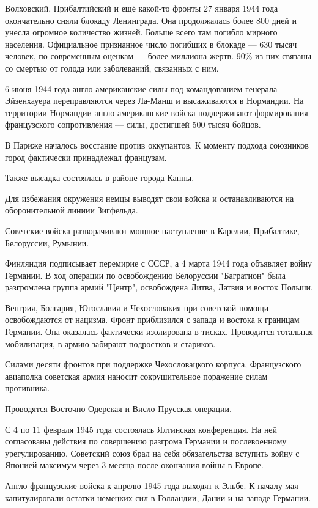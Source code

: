 \documentclass{article}
\begin{document}
Волховский, Прибалтийский и ещё какой-то фронты 27 января 1944 года окончательно сняли блокаду Ленинграда. Она продолжалась более 800 дней и унесла огромное количество жизней. Больше всего там погибло мирного населения. Официальное признанное число погибших в блокаде --- 630 тысяч человек, по современным оценкам --- более миллиона жертв. 90\% из них связаны со смертью от голода или заболеваний, связанных с ним.

6 июня 1944 года англо-американские силы под командованием генерала Эйзенхауера переправляются через Ла-Манш и высаживаются в Нормандии. На территории Нормандии англо-американские войска поддерживают формирования французского сопротивления --- силы, достигшей 500 тысяч бойцов.

В Париже началось восстание против оккупантов. К моменту подхода союзников город фактически принадлежал французам.

Также высадка состоялась в районе города Канны.

Для избежания окружения немцы выводят свои войска и останавливаются на оборонительной линиии Зигфельда.

Советские войска разворачивают мощное наступление в Карелии, Прибалтике, Белоруссии, Румынии.

Финляндия подписывает перемирие с СССР, а 4 марта 1944 года объявляет войну Германии. В ход операции по освобождению Белоруссии "Багратион" была разгромлена группа армий "Центр", освобождена Литва, Латвия и восток Польши.

Венгрия, Болгария, Югославия и Чехословакия при советской помощи освобождаются от нацизма. Фронт приблизился с запада и востока к границам Германии. Она оказалась фактически изолирована в тисках. Проводится тотальная мобилизация, в армию забирают подростков и стариков.

Силами десяти фронтов при поддержке Чехословацкого корпуса, Французского авиаполка советская армия наносит сокрушительное поражение силам противника.

Проводятся Восточно-Одерская и Висло-Прусская операции.

С 4 по 11 февраля 1945 года состоялась Ялтинская конференция. На ней согласованы действия по совершению разгрома Германии и послевоенному урегулированию. Советский союз брал на себя обязательства вступить войну с Японией максимум через 3 месяца после окончания войны в Европе.

Англо-французские войска к апрелю 1945 года выходят к Эльбе. К началу мая капитулировали остатки немецких сил в Голландии, Дании и на западе Германии.
\end{document}
